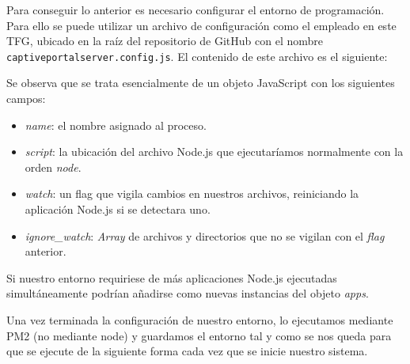 \begin{appendices}
Para conseguir lo anterior es necesario configurar el entorno de programación. Para ello se puede utilizar un archivo de configuración como el empleado en este TFG, ubicado en la raíz del repositorio de GitHub con el nombre \verb+captiveportalserver.config.js+. El contenido de este archivo es el siguiente:


Se observa que se trata esencialmente de un objeto JavaScript con los siguientes campos:

\begin{itemize}
\item \emph{name}: el nombre asignado al proceso.
\item \emph{script}: la ubicación del archivo Node.js que ejecutaríamos normalmente con la orden \emph{node}.
\item \emph{watch}: un flag que vigila cambios en nuestros archivos, reiniciando la aplicación Node.js si se detectara uno.
\item \emph{ignore\_watch}: \emph{Array} de archivos y directorios que no se vigilan con el \emph{flag} anterior.
\end{itemize}

Si nuestro entorno requiriese de más aplicaciones Node.js ejecutadas simultáneamente podrían añadirse como nuevas instancias del objeto \emph{apps}.

Una vez terminada la configuración de nuestro entorno, lo ejecutamos mediante PM2 (no mediante node) y guardamos el entorno tal y como se nos queda para que se ejecute de la siguiente forma cada vez que se inicie nuestro sistema.



\end{appendices}

